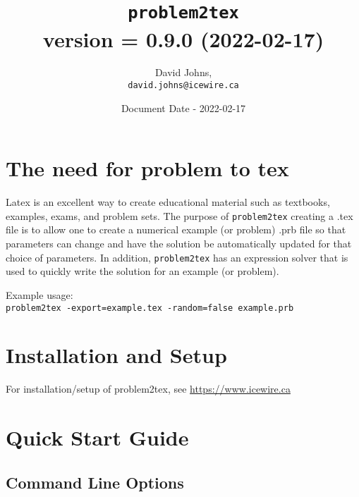 \documentclass{article}
\title{\color{blue}\texttt{problem2tex} \\ \normalsize{version = 0.9.0 (2022-02-17)}}
\author{
David Johns, \\ \texttt{david.johns@icewire.ca}
}
\date{Document Date - 2022-02-17}
\begin{document}
\maketitle
\tableofcontents

\section{The need for problem to tex}


Latex is an excellent way to create educational material such as textbooks, examples, exams, and problem sets.  The purpose of \texttt{problem2tex} creating a .tex file is to allow one to create a numerical example (or problem) .prb file so that parameters can change and have the solution be automatically updated for that choice of parameters.  In addition, \texttt{problem2tex} has an expression solver that is used to quickly write the solution for an example (or problem).  

Example usage:\\
\texttt{problem2tex -export=example.tex -random=false example.prb}

\section{Installation and Setup}

For installation/setup of problem2tex, see \href{https://www.icewire.ca}{https://www.icewire.ca}




\section{Quick Start Guide}

\subsection{Command Line Options}
\end{document}
